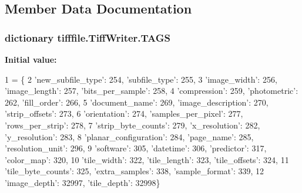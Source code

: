 \subsection{Member Data Documentation}
\hypertarget{classtifffile_1_1_tiff_writer_a59306b1d4123917f8ef19b622932be69}{
\subsubsection[{T\-A\-G\-S}]{\setlength{\rightskip}{0pt plus 5cm}dictionary tifffile.\-Tiff\-Writer.\-T\-A\-G\-S\hspace{0.3cm}{\ttfamily [static]}}}\label{classtifffile_1_1_tiff_writer_a59306b1d4123917f8ef19b622932be69}
{\bfseries Initial value\-:}
\begin{DoxyCode}
1 = \{
2         \textcolor{stringliteral}{'new\_subfile\_type'}: 254, \textcolor{stringliteral}{'subfile\_type'}: 255,
3         \textcolor{stringliteral}{'image\_width'}: 256, \textcolor{stringliteral}{'image\_length'}: 257, \textcolor{stringliteral}{'bits\_per\_sample'}: 258,
4         \textcolor{stringliteral}{'compression'}: 259, \textcolor{stringliteral}{'photometric'}: 262, \textcolor{stringliteral}{'fill\_order'}: 266,
5         \textcolor{stringliteral}{'document\_name'}: 269, \textcolor{stringliteral}{'image\_description'}: 270, \textcolor{stringliteral}{'strip\_offsets'}: 273,
6         \textcolor{stringliteral}{'orientation'}: 274, \textcolor{stringliteral}{'samples\_per\_pixel'}: 277, \textcolor{stringliteral}{'rows\_per\_strip'}: 278,
7         \textcolor{stringliteral}{'strip\_byte\_counts'}: 279, \textcolor{stringliteral}{'x\_resolution'}: 282, \textcolor{stringliteral}{'y\_resolution'}: 283,
8         \textcolor{stringliteral}{'planar\_configuration'}: 284, \textcolor{stringliteral}{'page\_name'}: 285, \textcolor{stringliteral}{'resolution\_unit'}: 296,
9         \textcolor{stringliteral}{'software'}: 305, \textcolor{stringliteral}{'datetime'}: 306, \textcolor{stringliteral}{'predictor'}: 317, \textcolor{stringliteral}{'color\_map'}: 320,
10         \textcolor{stringliteral}{'tile\_width'}: 322, \textcolor{stringliteral}{'tile\_length'}: 323, \textcolor{stringliteral}{'tile\_offsets'}: 324,
11         \textcolor{stringliteral}{'tile\_byte\_counts'}: 325, \textcolor{stringliteral}{'extra\_samples'}: 338, \textcolor{stringliteral}{'sample\_format'}: 339,
12         \textcolor{stringliteral}{'image\_depth'}: 32997, \textcolor{stringliteral}{'tile\_depth'}: 32998\}
\end{DoxyCode}
